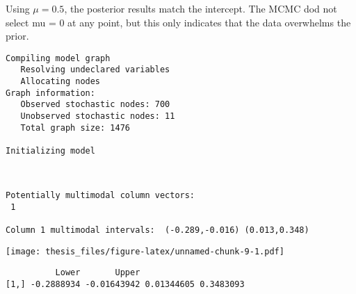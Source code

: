 \documentclass[12pt,twoside]{dukestatscithesis}
\theoremstyle{definition}
\theoremstyle{definition}
\theoremstyle{definition}
\theoremstyle{remark}
\begin{document}
Using \(\mu=0.5\), the posterior results match the intercept. The MCMC
dod not select mu = 0 at any point, but this only indicates that the
data overwhelms the prior.
\begin{Shaded}
\begin{Highlighting}[]
\StringTok{ }\NormalTok{(}
                    \NormalTok{, }\NormalTok{(}\NormalTok{, }\NormalTok{, }\NormalTok{,}\NormalTok{, }\NormalTok{),}
\end{Highlighting}
\end{Shaded}
\begin{verbatim}
Compiling model graph
   Resolving undeclared variables
   Allocating nodes
Graph information:
   Observed stochastic nodes: 700
   Unobserved stochastic nodes: 11
   Total graph size: 1476

Initializing model
\end{verbatim}
\begin{Shaded}
\begin{Highlighting}[]
\OperatorTok{$}\OperatorTok{$}\OperatorTok{$}
\end{Highlighting}
\end{Shaded}
\begin{verbatim}


Potentially multimodal column vectors:
 1 

Column 1 multimodal intervals:  (-0.289,-0.016) (0.013,0.348) 
\end{verbatim}
\texttt{[image: thesis\_files/figure-latex/unnamed-chunk-9-1.pdf]}
\begin{verbatim}
          Lower       Upper                     
[1,] -0.2888934 -0.01643942 0.01344605 0.3483093
\end{verbatim}
\begin{Shaded}
\begin{Highlighting}[]
\OperatorTok{$}\OperatorTok{$}\OperatorTok{$}
\end{Highlighting}
\end{Shaded}
\end{document}
